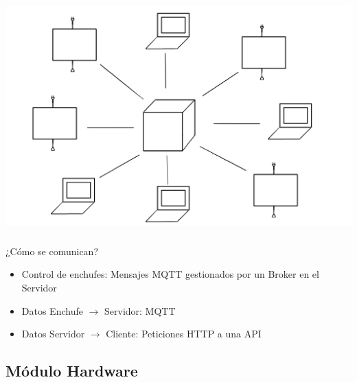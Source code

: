 \documentclass[compress, aspectratio=169]{beamer} %
\begin{document}
\begin{frame}
  \transdissolve[duration=1]
  \frametitle{\insertsubsection}
  \centering\includegraphics[scale=0.7]{img/esquema_estrella.png}
\end{frame}

\begin{frame}
  \transdissolve[duration=1]
  \frametitle{\insertsubsection}
  ¿Cómo se comunican?
  \begin{itemize}
    \item{Control de enchufes: Mensajes MQTT gestionados por un Broker
      en el Servidor}
    \item{Datos Enchufe $\rightarrow$ Servidor: MQTT}
    \item{Datos Servidor $\rightarrow$ Cliente: Peticiones HTTP a
      una API}
  \end{itemize}
\end{frame}


\subsection{Módulo Hardware}
\begin{frame}
  \transdissolve[duration=1]
  \frametitle{\insertsubsection}
\end{frame}
\end{document}
